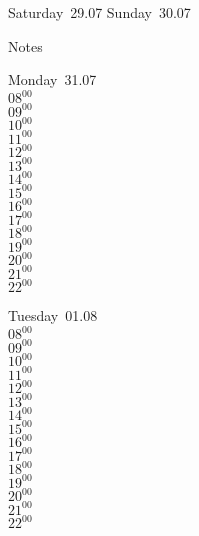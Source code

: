 \documentclass[11pt,a4paper]{book}\usepackage[]{graphicx}\usepackage[]{color}
\begin{document}
\begin{weekendbox}
  Saturday~29.07
  \tcblower
  Sunday~30.07
\end{weekendbox} %
\begin{notebox}
  Notes
\end{notebox}
\clearpage
\begin{headerbox}
\end{headerbox}
\begin{weekdaybox}
  Monday~31.07\\
  { 
  \vfill
  $08^{00}$\\
$09^{00}$\\
$10^{00}$\\
$11^{00}$\\
$12^{00}$\\
$13^{00}$\\
$14^{00}$\\
$15^{00}$\\
$16^{00}$\\
$17^{00}$\\
$18^{00}$\\
$19^{00}$\\
$20^{00}$\\
$21^{00}$\\
$22^{00}$\\
  }
\end{weekdaybox}
\begin{weekdaybox}
  Tuesday~01.08\\
  { 
  \vfill
  $08^{00}$\\
$09^{00}$\\
$10^{00}$\\
$11^{00}$\\
$12^{00}$\\
$13^{00}$\\
$14^{00}$\\
$15^{00}$\\
$16^{00}$\\
$17^{00}$\\
$18^{00}$\\
$19^{00}$\\
$20^{00}$\\
$21^{00}$\\
$22^{00}$\\
  }
\end{weekdaybox}
\end{document}
